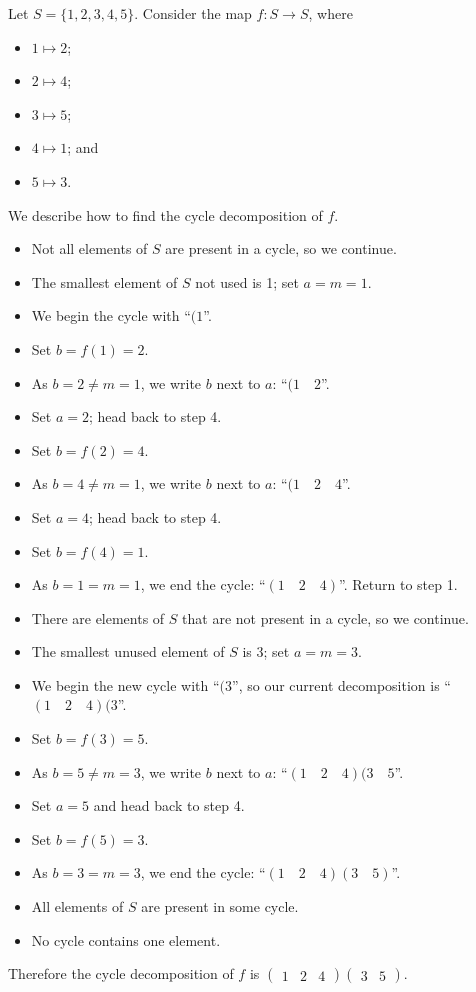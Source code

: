 \begin{example}
    Let $S = \{1,2,3,4,5\}$. Consider the map $f: S \to S$, where
    \begin{itemize}
        \item $1 \mapsto 2$;
        \item $2 \mapsto 4$;
        \item $3 \mapsto 5$;
        \item $4 \mapsto 1$; and
        \item $5 \mapsto 3$.
    \end{itemize}
    We describe how to find the cycle decomposition of $f$.
    \begin{itemize}
        \item Not all elements of $S$ are present in a cycle, so we continue.
        \item The smallest element of $S$ not used is 1; set $a = m = 1$.
        \item We begin the cycle with ``$(1$''.
        \item Set $b = f(1) = 2$.
        \item As $b = 2 \neq m = 1$, we write $b$ next to $a$: ``$(1\quad2$''.
        \item Set $a = 2$; head back to step 4.
        \item Set $b = f(2) = 4$.
        \item As $b = 4 \neq m = 1$, we write $b$ next to $a$: ``$(1\quad2\quad4$''.
        \item Set $a = 4$; head back to step 4.
        \item Set $b = f(4) = 1$.
        \item As $b = 1 = m = 1$, we end the cycle: ``$(1\quad2\quad4)$''. Return to step 1.
        \item There are elements of $S$ that are not present in a cycle, so we continue.
        \item The smallest unused element of $S$ is 3; set $a = m = 3$.
        \item We begin the new cycle with ``$(3$'', so our current decomposition is ``$(1\quad2\quad4)(3$''.
        \item Set $b = f(3) = 5$.
        \item As $b = 5 \neq m = 3$, we write $b$ next to $a$: ``$(1\quad2\quad4)(3\quad5$''.
        \item Set $a = 5$ and head back to step 4.
        \item Set $b = f(5) = 3$.
        \item As $b = 3 = m = 3$, we end the cycle: ``$(1\quad2\quad4)(3\quad5)$''.
        \item All elements of $S$ are present in some cycle.
        \item No cycle contains one element.
    \end{itemize}
    Therefore the cycle decomposition of $f$ is $\begin{pmatrix}1&2&4\end{pmatrix}\begin{pmatrix}3&5\end{pmatrix}$.
\end{example}

